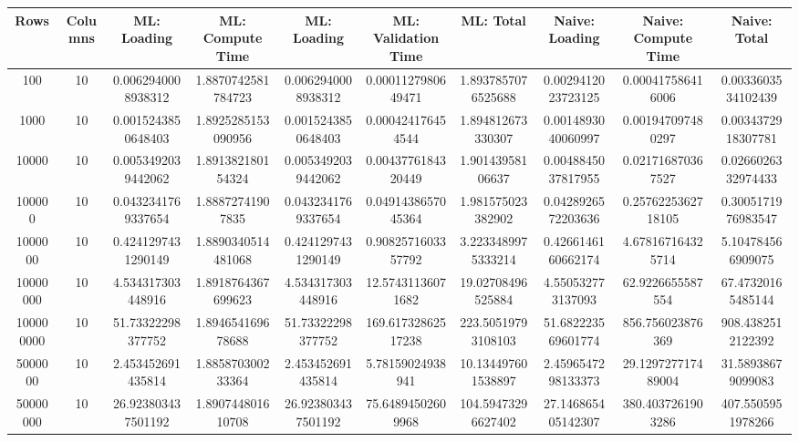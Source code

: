 \begin{table}[htb]
    \centering
    \begin{tabular}{@{}cccccccccc@{}}
        \toprule
        Rows & Columns & ML: Loading & ML: Compute Time & ML: Loading & ML: Validation Time & ML: Total & Naive: Loading & Naive: Compute Time & Naive: Total \\
        \midrule
        100 & 10 & 0.0062940008938312 & 1.8870742581784723 & 0.0062940008938312 & 0.0001127980649471 & 1.8937857076525688 & 0.0029412023723125 & 0.000417586416006 & 0.0033603534102439 \\
        1000 & 10 & 0.0015243850648403 & 1.8925285153090956 & 0.0015243850648403 & 0.000424176454544 & 1.894812673330307 & 0.0014893040060997 & 0.001947097480297 & 0.0034372918307781 \\
        10000 & 10 & 0.0053492039442062 & 1.891382180154324 & 0.0053492039442062 & 0.0043776184320449 & 1.90143958106637 & 0.0048845037817955 & 0.021716870367527 & 0.0266026332974433 \\
        100000 & 10 & 0.0432341769337654 & 1.88872741907835 & 0.0432341769337654 & 0.0491438657045364 & 1.981575023382902 & 0.0428926572203636 & 0.2576225362718105 & 0.3005171976983547 \\
        1000000 & 10 & 0.4241297431290149 & 1.8890340514481068 & 0.4241297431290149 & 0.9082571603357792 & 3.2233489975333214 & 0.4266146160662174 & 4.678167164325714 & 5.104784566909075 \\
        10000000 & 10 & 4.534317303448916 & 1.8918764367699623 & 4.534317303448916 & 12.57431136071682 & 19.02708496525884 & 4.550532773137093 & 62.9226655587554 & 67.47320165485144 \\
        100000000 & 10 & 51.73322298377752 & 1.894654169678688 & 51.73322298377752 & 169.61732862517238 & 223.50519793108103 & 51.682223569601774 & 856.756023876369 & 908.4382512122392 \\
        5000000 & 10 & 2.453452691435814 & 1.885870300233364 & 2.453452691435814 & 5.78159024938941 & 10.134497601538897 & 2.4596547298133373 & 29.129727717489004 & 31.58938679099083 \\
        50000000 & 10 & 26.923803437501192 & 1.890744801610708 & 26.923803437501192 & 75.64894502609968 & 104.59473296627402 & 27.146865405142307 & 380.4037261903286 & 407.5505951978266 \\
        \bottomrule
    \end{tabular}
\end{table}